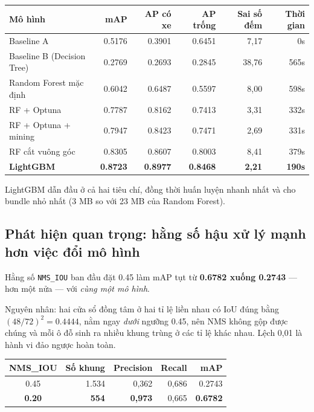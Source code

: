 \documentclass[12pt]{ai_conquer2026}
\begin{document}
\begin{center}
\begin{tabular}{|l|r|r|r|r|r|}
\hline
\textbf{Mô hình} & \textbf{mAP} & \textbf{AP có xe} & \textbf{AP trống} & \textbf{Sai số đếm} & \textbf{Thời gian} \\
\hline
Baseline A & 0.5176 & 0.3901 & 0.6451 & 7,17 & 0s \\
Baseline B (Decision Tree) & 0.2769 & 0.2693 & 0.2845 & 38,76 & 565s \\
Random Forest mặc định & 0.6042 & 0.6487 & 0.5597 & 8,00 & 598s \\
RF + Optuna & 0.7787 & 0.8162 & 0.7413 & 3,31 & 332s \\
RF + Optuna + mining & 0.7947 & 0.8423 & 0.7471 & 2,69 & 331s \\
RF cắt vuông góc & 0.8305 & 0.8607 & 0.8003 & 8,41 & 379s \\
\textbf{LightGBM} & \textbf{0.8723} & \textbf{0.8977} & \textbf{0.8468} & \textbf{2,21} & \textbf{190s} \\
\hline
\end{tabular}
\end{center}

LightGBM dẫn đầu ở cả hai tiêu chí, đồng thời huấn luyện nhanh nhất và cho bundle nhỏ nhất (3 MB so với 23 MB của Random Forest).

\subsection{Phát hiện quan trọng: hằng số hậu xử lý mạnh hơn việc đổi mô hình}

Hằng số \texttt{NMS\_IOU} ban đầu đặt 0.45 làm mAP tụt từ \textbf{0.6782 xuống 0.2743} --- hơn một nửa --- với \textit{cùng một mô hình}.

Nguyên nhân: hai cửa sổ đồng tâm ở hai tỉ lệ liền nhau có IoU đúng bằng $(48/72)^2 = 0.4444$, nằm ngay \textit{dưới} ngưỡng 0.45, nên NMS không gộp được chúng và mỗi ô đỗ sinh ra nhiều khung trùng ở các tỉ lệ khác nhau. Lệch 0,01 là hành vi đảo ngược hoàn toàn.

\begin{center}
\begin{tabular}{|c|r|r|r|r|}
\hline
\textbf{NMS\_IOU} & \textbf{Số khung} & \textbf{Precision} & \textbf{Recall} & \textbf{mAP} \\
\hline
0.45 & 1.534 & 0,362 & 0,686 & 0.2743 \\
\textbf{0.20} & \textbf{554} & \textbf{0,973} & 0,665 & \textbf{0.6782} \\
\hline
\end{tabular}
\end{center}
\end{document}
